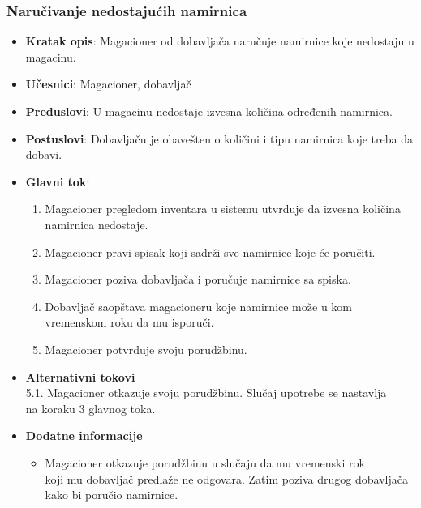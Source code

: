  \subsubsection{Naručivanje nedostajućih namirnica}
 \begin{itemize}
    \item \textbf{Kratak opis}:
   Magacioner od dobavljača naručuje namirnice koje nedostaju u magacinu.
    \item \textbf{Učesnici}:
    Magacioner, dobavljač
    \item \textbf{Preduslovi}:
    U magacinu nedostaje izvesna količina određenih namirnica.
    \item \textbf{Postuslovi}:
    Dobavljaču je obavešten o količini i tipu namirnica koje treba da dobavi. 
    \item \textbf{Glavni tok}:
    \begin{enumerate}
        \item Magacioner pregledom inventara u sistemu utvrđuje da izvesna količina namirnica nedostaje.
        \item Magacioner pravi spisak koji sadrži sve namirnice koje će poručiti.
        \item Magacioner poziva dobavljača i poručuje namirnice sa spiska.
        \item Dobavljač saopštava magacioneru koje namirnice može u kom vremenskom roku da mu isporuči.
        \item Magacioner potvrđuje svoju porudžbinu.
    \end{enumerate}
\item \textbf{Alternativni tokovi}\\
        5.1. Magacioner otkazuje svoju porudžbinu. Slučaj upotrebe se nastavlja\\ na koraku 3 glavnog toka.
 
 \item \textbf{Dodatne informacije}
 \begin{itemize}
     \item 
    Magacioner otkazuje porudžbinu u slučaju da mu vremenski rok\\ koji mu dobavljač predlaže ne odgovara. Zatim poziva drugog dobavljača kako bi poručio namirnice.

 \end{itemize}
 \end{itemize}
 
